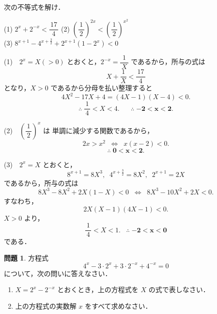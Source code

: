 \documentclass[b5paper,uplatex,dvipdfmx,fleqn]{jsarticle}
\theoremstyle{definition}
\newtheorem{prb}[thm]{問題}
\begin{document}
\begin{reidai}
次の不等式を解け．\vspace{0.2cm}

\noindent
(1)
$2^{x} + 2^{-x} < \dfrac{\,17\,}{4}$\hspace{2cm}
(2)
$\left( \dfrac{\,1\,}{2} \right)^{2x} < \left( \dfrac{\,1\,}{2} \right)^{x^{2}}$\vspace{0.4cm}\\
(3)
$8^{x + 1} - 4^{x + \frac{3}{2}} + 2^{x + 1}(1 - 2^{x}) < 0$\vspace{0.2cm}

\tcblower

\noindent
(1)\ \ 
$2^{x} = X (> 0)$ とおくと，$2^{-x} = \dfrac{1}{\,X\,}$ であるから，所与の式は
\[
X + \frac{\,1\,}{X} < \frac{\,17\,}{4}
\]
となり，$X > 0$ であるから分母を払い整理すると
\[
4X^{2} - 17X + 4 = (4X - 1)(X - 4) < 0.
\]
\[
\therefore\; \frac{\,1\,}{4} < X < 4.\;\;\;\;\;\; \therefore\; \boldsymbol{-2 < x < 2}.
\]

\vspace{0.4cm}

\noindent
(2)\ \ 
$\left( \dfrac{\,1\,}{2} \right)^{x}$ は 単調に減少する関数であるから，
\[
2x > x^{2}\;\; \Leftrightarrow\;\; x(x - 2) < 0.
\]
\[
\therefore\; \boldsymbol{0 < x < 2}.
\]

\vspace{0.4cm}

\noindent
(3)\ \ 
$2^{x} = X$ とおくと，
\[
8^{x + 1} = 8X^{3},\;\; 4^{x + \frac{3}{2}} = 8X^{2},\;\; 2^{x + 1} = 2X
\]
であるから，所与の式は
\[
8X^{3} - 8X^{2} + 2X(1 - X) < 0\;\; \Leftrightarrow\;\; 8X^{3} - 10X^{2} + 2X < 0.
\]
すなわち，
\[
2X(X - 1)(4X - 1) < 0.
\]
$X > 0$ より，
\[
\frac{\,1\,}{4} < X < 1.\;\;\; \therefore\; \boldsymbol{-2 < x < 0}
\]
である．
\vspace{0.55cm}

\end{reidai}

\newpage
\noindent
\colorbox{black}{\textcolor{white}{}}
\begin{prb}
方程式
\[
4^{x} - 3 \cdot 2^{x} + 3 \cdot 2^{-x} + 4^{-x} = 0
\]
について，次の問いに答えなさい．
\begin{enumerate}
\item
$X = 2^{x} - 2^{-x}$ とおくとき，上の方程式を $X$ の式で表しなさい．
\item
上の方程式の実数解 $x$ をすべて求めなさい．
\end{enumerate}
\end{prb}\vfill
\end{document}
